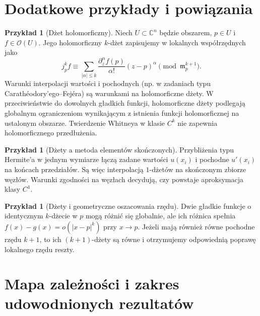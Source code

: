 \documentclass[11pt,a4paper,oneside]{book}
\numberwithin{equation}{chapter}
\theoremstyle{plain}
\theoremstyle{definition}
\newtheorem{przyklad}[twierdzenie]{Przykład}
\theoremstyle{remark}
\begin{document}
\section{Dodatkowe przykłady i powiązania}
\begin{przyklad}[Dżet holomorficzny]
Niech $U\subset\mathbb C^n$ będzie obszarem,
$p\in U$ i $f\in\mathcal O(U)$. Jego holomorficzny
$k$-dżet zapisujemy w lokalnych współrzędnych jako
\[
 j_p^kf\equiv\sum_{|\alpha|\le k}
 \frac{\partial_z^\alpha f(p)}{\alpha!}(z-p)^\alpha
 \pmod{\mathfrak m_p^{k+1}}.
\]
Warunki interpolacji wartości i pochodnych
(np. w zadaniach typu Carathéodory'ego--Fejéra)
są warunkami na holomorficzne dżety.
W przeciwieństwie do dowolnych gładkich funkcji,
holomorficzne dżety podlegają globalnym ograniczeniom
wynikającym z istnienia funkcji holomorficznej na
ustalonym obszarze. Twierdzenie Whitneya w klasie $C^k$
nie zapewnia holomorficznego przedłużenia.
\end{przyklad}

\begin{przyklad}[Dżety a metoda elementów skończonych]
Przybliżenia typu Hermite'a w jednym wymiarze
łączą zadane wartości $u(x_i)$ i pochodne $u'(x_i)$
na końcach przedziałów. Są więc interpolacją
$1$-dżetów na skończonym zbiorze węzłów.
Warunki zgodności na węzłach decydują,
czy powstaje aproksymacja klasy $C^1$.
\end{przyklad}

\begin{przyklad}[Dżety i geometryczne oszacowania rzędu]
Dwie gładkie funkcje o identycznym $k$-dżecie w $p$
mogą różnić się globalnie, ale ich różnica
spełnia $f(x)-g(x)=o(|x-p|^k)$ przy $x\to p$.
Jeżeli mają również równe pochodne rzędu $k+1$,
to ich $(k+1)$-dżety są równe i otrzymujemy
odpowiednią poprawę lokalnego rzędu reszty.
\end{przyklad}

\section{Mapa zależności i zakres udowodnionych rezultatów}
\begin{center}
\end{center}
\end{document}
